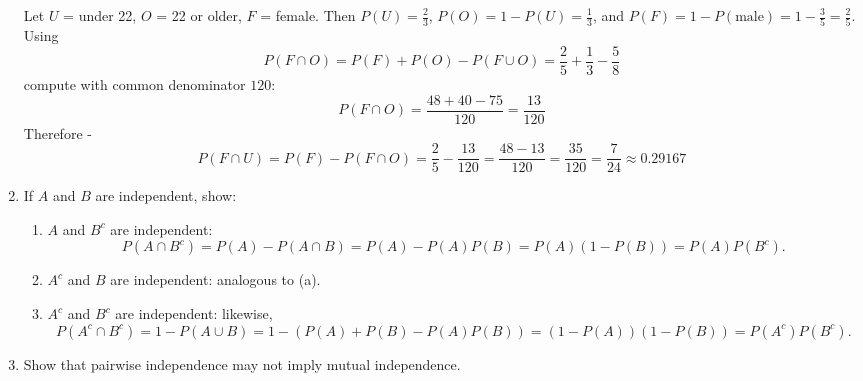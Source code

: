 \begin{enumerate}
    Let $U$ = under 22, $O$ = 22 or older, $F$ = female. Then $P(U)=\tfrac{2}{3}$, $P(O)=1-P(U)=\tfrac{1}{3}$, and $P(F)=1-P(\text{male})=1-\tfrac{3}{5}=\tfrac{2}{5}$. Using
    $$P(F\cap O)=P(F)+P(O)-P(F\cup O)=\frac{2}{5}+\frac{1}{3}-\frac{5}{8}$$
    compute with common denominator $120$:
    $$P(F\cap O)=\frac{48+40-75}{120}=\frac{13}{120}$$
    Therefore - 
    $$\boxed{P(F\cap U)=P(F)-P(F\cap O)=\frac{2}{5}-\frac{13}{120}=\frac{48-13}{120}=\frac{35}{120}=\frac{7}{24}\approx 0.29167}$$
    \item If $A$ and $B$ are independent, show:
    \begin{enumerate}
        \item $A$ and $B^c$ are independent:
        \[
        P(A\cap B^c)=P(A)-P(A\cap B)=P(A)-P(A)P(B)=P(A)(1-P(B))=P(A)P(B^c).
        \]
        \item $A^c$ and $B$ are independent: analogous to (a).
        \item $A^c$ and $B^c$ are independent: likewise,
        \[
        P(A^c\cap B^c)=1-P(A\cup B)=1-(P(A)+P(B)-P(A)P(B))=(1-P(A))(1-P(B))=P(A^c)P(B^c).
        \]
    \end{enumerate}
    \item Show that pairwise independence may not imply mutual independence.


\end{enumerate}
